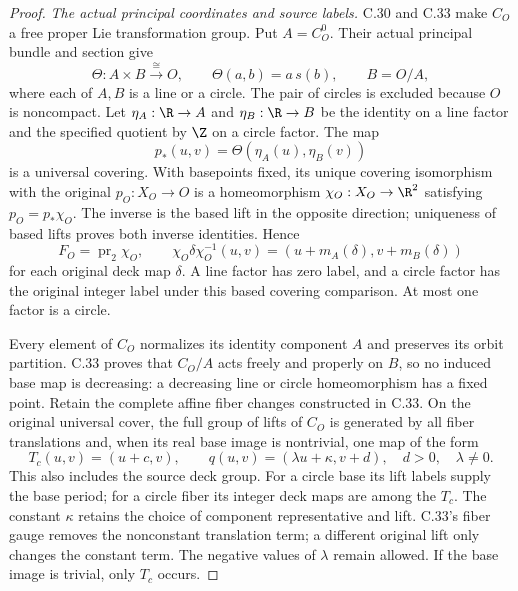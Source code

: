 \begin{proof}
\emph{The actual principal coordinates and source labels.}
C.30 and C.33 make $C_O$ a free proper Lie transformation
group. Put $A=C_O^0$. Their actual principal bundle and
section give
\[
 \Theta:A\times B\xrightarrow{\ \cong\ }O,
 \qquad\Theta(a,b)=a\,s(b),\qquad B=O/A,
                                                               \tag{C.63.2}
\]
where each of $A,B$ is a line or a circle. The pair of
circles is excluded because $O$ is noncompact.
Let $\eta_A:\R\to A$ and $\eta_B:\R\to B$ be the identity
on a line factor and the specified quotient by $\Z$ on
a circle factor. The map
\[
               p_*(u,v)=\Theta(\eta_A(u),\eta_B(v))
                                                               \tag{C.63.3}
\]
is a universal covering. With basepoints fixed, its unique
covering isomorphism with the original $p_O:X_O\to O$ is
a homeomorphism $\chi_O:X_O\to\R^2$ satisfying
$p_O=p_*\chi_O$. The inverse is the based lift in the
opposite direction; uniqueness of based lifts proves
both inverse identities. Hence
\[
 F_O=\operatorname{pr}_2\chi_O,
 \qquad
 \chi_O\delta\chi_O^{-1}(u,v)
       =(u+m_A(\delta),v+m_B(\delta))
                                                               \tag{C.63.4}
\]
for each original deck map $\delta$. A line factor has
zero label, and a circle factor has the original integer
label under this based covering comparison. At most one
factor is a circle.

Every element of $C_O$ normalizes its identity component
$A$ and preserves its orbit partition. C.33 proves that
$C_O/A$ acts freely and properly on $B$, so no induced
base map is decreasing: a decreasing line or circle
homeomorphism has a fixed point. Retain the complete
affine fiber changes constructed in C.33. On the original
universal cover, the full group of lifts of $C_O$ is
generated by all fiber translations and, when its real
base image is nontrivial, one map of the form
\[
 T_c(u,v)=(u+c,v),\qquad
 q(u,v)=(\lambda u+\kappa,v+d),
 \quad d>0,\quad\lambda\ne0.                            \tag{C.63.5}
\]
This also includes the source deck group. For a circle
base its lift labels supply the base period; for a
circle fiber its integer deck maps are among the
$T_c$. The constant $\kappa$ retains the choice of
component representative and lift. C.33's fiber gauge
removes the nonconstant translation term; a different
original lift only changes the constant term. The
negative values of $\lambda$ remain allowed. If the
base image is trivial, only $T_c$ occurs.


\end{proof}
